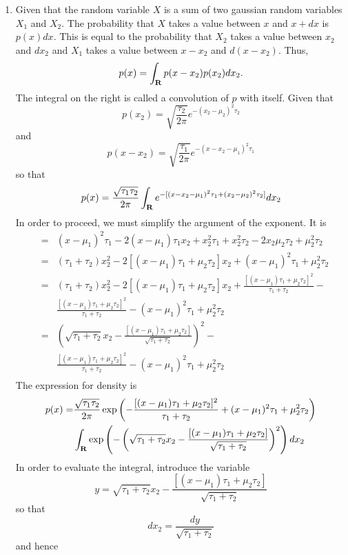 \begin{enumerate}
\item Given that the random variable $X$ is a sum of two gaussian random variables $X_1$ and $X_2$.
The probability that $X$ takes a value between $x$ and $x + dx$ is $p(x)dx$. This is equal to the
probability that $X_2$ takes a value between $x_2$ and $dx_2$ and $X_1$ takes a value between $x - x_2$
and $d(x - x_2)$. Thus,
\[
p(x) = \int_{\mathbf{R}} p(x - x_2)p(x_2)dx_2.
\]
The integral on the right is called a convolution of $p$ with itself. Given that
\[
p(x_2) = \sqrt{\frac{\tau_2}{2\pi}}e^{-(x_2 - \mu_2)^2\tau_2}
\]
and
\[
p(x - x_2) = \sqrt{\frac{\tau_1}{2\pi}}e^{-(x - x_2 - \mu_1)^2\tau_1}
\]
so that
\[
p(x) = \frac{\sqrt{\tau_1\tau_2}}{2\pi}\int_{\mathbf{R}} e^{-[(x - x_2 - \mu_1)^2\tau_1 + (x_2 - \mu_2)^2\tau_2]}dx_2
\]
In order to proceed, we must simplify the argument of the exponent. It is
\begin{eqnarray*}
&=& (x - \mu_1)^2\tau_1 - 2(x - \mu_1)\tau_1x_2 + x_2^2\tau_1 + x_2^2\tau_2 - 2x_2\mu_2\tau_2 + \mu_2^2\tau_2 \\
&=& (\tau_1 + \tau_2)x_2^2 -2[(x - \mu_1)\tau_1 + \mu_2\tau_2]x_2 + (x - \mu_1)^2\tau_1 + \mu_2^2\tau_2 \\
&=& (\tau_1 + \tau_2)x_2^2 -2[(x - \mu_1)\tau_1 + \mu_2\tau_2]x_2 + \frac{[(x - \mu_1)\tau_1 + \mu_2\tau_2]^2}{\tau_1 + \tau_2} - \\
& & \frac{[(x - \mu_1)\tau_1 + \mu_2\tau_2]^2}{\tau_1 + \tau_2} - (x - \mu_1)^2\tau_1 + \mu_2^2\tau_2 \\
&=& \left(\sqrt{\tau_1 + \tau_2}x_2 - \frac{[(x - \mu_1)\tau_1 + \mu_2\tau_2]}{\sqrt{\tau_1 + \tau_2}}\right)^2 - \\
& & \frac{[(x - \mu_1)\tau_1 + \mu_2\tau_2]^2}{\tau_1 + \tau_2} - (x - \mu_1)^2\tau_1 + \mu_2^2\tau_2 \\
\end{eqnarray*}
The expression for density is
\[
\begin{split}
p(x) = & \frac{\sqrt{\tau_1\tau_2}}{2\pi}\exp\left(-\frac{[(x - \mu_1)\tau_1 + \mu_2\tau_2]^2}{\tau_1 + \tau_2} + (x - \mu_1)^2\tau_1 + \mu_2^2\tau_2\right) \\
 & \int_{\mathbf{R}}\exp\left(-\left(\sqrt{\tau_1 + \tau_2}x_2 - \frac{[(x - \mu_1)\tau_1 + \mu_2\tau_2]}{\sqrt{\tau_1 + \tau_2}}\right)^2\right)dx_2
\end{split}
\]
In order to evaluate the integral, introduce the variable
\[
y = \sqrt{\tau_1 + \tau_2}x_2 - \frac{[(x - \mu_1)\tau_1 + \mu_2\tau_2]}{\sqrt{\tau_1 + \tau_2}}
\]
so that
\[
dx_2 = \frac{dy}{\sqrt{\tau_1 + \tau_2}}
\]
and hence
\[
\begin{split}

\end{split}\]
\end{enumerate}
